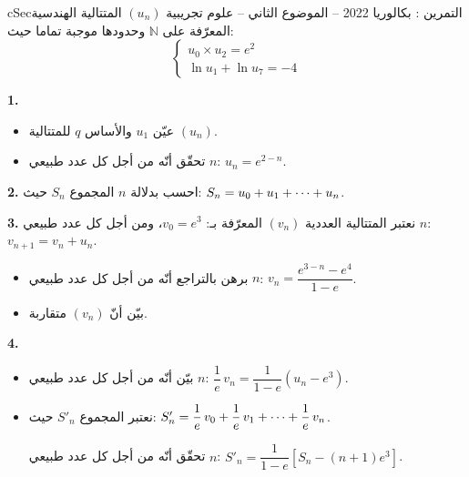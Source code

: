\documentclass[12pt,a4paper]{article}
\newenvironment{BOX}[2]{\begin{otherlanguage}{english}\begin{arbox}{#1}{#2}}{\end{arbox}\end{otherlanguage}}
\newcounter{exo}
\newenvironment{tamrin}[1]{\stepcounter{exo}\begin{BOX}{cSec}{التمرين \theexo: #1}}{\end{BOX}}
\renewcommand{\cdots}{\mathinner{\cdotp\cdotp\cdotp}}
\newcommand{\N}{\mathbb{N}}
\newenvironment{sq}{\begin{itemize}[leftmargin=2.4em,itemsep=3pt]}{\end{itemize}}
\newcommand{\qa}{\item[(أ)]}\newcommand{\qb}{\item[(ب)]}\newcommand{\qc}{\item[(جـ)]}\newcommand{\qd}{\item[(د)]}\newcommand{\qe}{\item[(هـ)]}
\newcommand{\QQ}[1]{\par\smallskip\textbf{#1.} }
\begin{document}
\begin{tamrin}{بكالوريا 2022 -- الموضوع الثاني -- علوم تجريبية}
$(u_n)$ المتتالية الهندسية المعرّفة على $\N$ وحدودها موجبة تماما حيث:
\[\begin{cases}u_0\times u_2=e^2\\ \ln u_1+\ln u_7=-4\end{cases}\]
\QQ{1}
\begin{sq}
\qa عيّن $u_1$ والأساس $q$ للمتتالية $(u_n)$.
\qb تحقّق أنّه من أجل كل عدد طبيعي $n$: $u_n=e^{2-n}$.
\end{sq}
\QQ{2} احسب بدلالة $n$ المجموع $S_n$ حيث: $S_n=u_0+u_1+\cdots+u_n$.
\QQ{3} نعتبر المتتالية العددية $(v_n)$ المعرّفة بـ: $v_0=e^3$، ومن أجل كل عدد طبيعي $n$: $v_{n+1}=v_n+u_n$.
\begin{sq}
\qa برهن بالتراجع أنّه من أجل كل عدد طبيعي $n$: $v_n=\dfrac{e^{3-n}-e^4}{1-e}$.
\qb بيّن أنّ $(v_n)$ متقاربة.
\end{sq}
\QQ{4}
\begin{sq}
\qa بيّن أنّه من أجل كل عدد طبيعي $n$: $\dfrac1e\,v_n=\dfrac{1}{1-e}\left(u_n-e^3\right)$.
\qb نعتبر المجموع $S'_n$ حيث: $S'_n=\dfrac1e\,v_0+\dfrac1e\,v_1+\cdots+\dfrac1e\,v_n$.

تحقّق أنّه من أجل كل عدد طبيعي $n$: $S'_n=\dfrac{1}{1-e}\left[S_n-(n+1)e^3\right]$.
\end{sq}
\end{tamrin}
\end{document}
